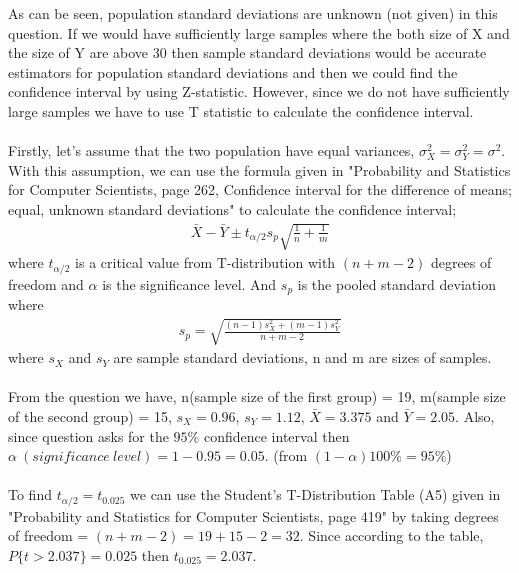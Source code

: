 \documentclass[12pt]{article}
\begin{document}
As can be seen, population standard deviations are unknown (not given) in this question. If we would have sufficiently large samples where the both size of X and the size of Y are above 30 then sample standard deviations would be accurate estimators for population standard deviations and then we could find the confidence interval by using Z-statistic. However, since we do not have sufficiently large samples we have to use T statistic to calculate the confidence interval. \\ \\
Firstly, let's assume that the two population have equal variances, $\sigma^{2}_{X} = \sigma^{2}_{Y}  = \sigma^{2}$. With this assumption, we can use the formula given in "Probability and Statistics for Computer Scientists, page 262, Confidence interval for the difference of means; equal, unknown standard deviations" to calculate the confidence interval;
\begin{equation} 
\begin{split}
\bar{X} - \bar{Y} \pm t_{\alpha/2}s_{p}\sqrt{\frac{1}{n}+\frac{1}{m}}
\end{split}
\end{equation}
where $t_{\alpha/2}$ is a critical value from T-distribution with $(n+m-2)$ degrees of freedom and $\alpha$ is the significance level. And $s_{p}$ is the pooled standard deviation where
\begin{equation} 
\begin{split}
s_{p} = \sqrt{\frac{(n-1)s^2_{X} + (m-1)s^2_{Y}}{n+m-2}}
\end{split}
\end{equation}
where $s_{X}$ and $s_{Y}$ are sample standard deviations, n and m are sizes of samples. \\ \\
From the question we have, n(sample size of the first group) = 19, m(sample size of the second group) = 15, $s_{X} = 0.96$, $s_{Y} = 1.12$, $\bar{X} = 3.375$ and $\bar{Y} = 2.05$. Also, since question asks for the $95\%$ confidence interval then $\alpha \ (significance \ level) = 1-0.95 = 0.05$. (from $(1-\alpha)100\% = 95\%$)\\ \\
To find $t_{\alpha/2} = t_{0.025}$ we can use the Student's T-Distribution Table (A5) given in "Probability and Statistics for Computer Scientists, page 419" by taking degrees of freedom = $(n+m-2) = 19 + 15 -2 = 32$. Since according to the table, $P\{t > 2.037\} = 0.025$ then $t_{0.025} = 2.037$. \\ \\
\end{document}
